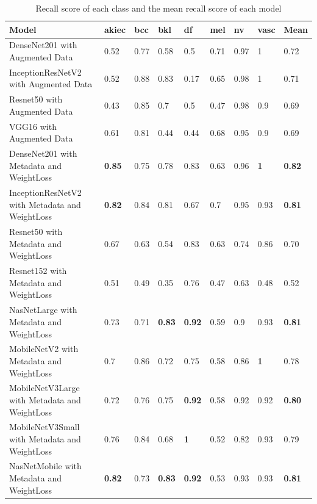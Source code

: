 \documentclass[sensors,article,submit,pdftex,moreauthors]{Definitions/mdpi}
\begin{document}
\begin{table}[h]
	\centering
	\begin{tabular}{|p{5cm} | p{0.6cm} | p{0.6cm} | p{0.6cm} | p{0.6cm} | p{0.6cm} | p{0.6cm} | p{0.6cm} | p{0.7cm}|} 
		\hline
		Model & akiec & bcc & bkl & df & mel & nv & vasc & Mean \\
		\hline
		DenseNet201 with Augmented Data & 0.52 & 0.77 & 0.58 & 0.5 & 0.71 & 0.97 & 1 & 0.72\\ 
		\hline
		InceptionResNetV2 with Augmented Data & 0.52 & 0.88 & 0.83 & 0.17 & 0.65 & 0.98 & 1 & 0.71\\
		\hline
		Resnet50 with Augmented Data & 0.43 & 0.85 & 0.7 & 0.5 & 0.47 & 0.98 & 0.9 & 0.69\\
		\hline 	
		VGG16 with Augmented Data & 0.61 & 0.81 & 0.44 & 0.44 & 0.68 & 0.95 & 0.9 & 0.69\\ 
		\hline		
		DenseNet201 with Metadata and WeightLoss & \textbf{0.85} & 0.75 & 0.78 & 0.83 & 0.63 & 0.96 & \textbf{1} & \textbf{0.82}\\
		\hline
		InceptionResNetV2 with Metadata and WeightLoss & \textbf{0.82} & 0.84 & 0.81 & 0.67 & 0.7 & 0.95 & 0.93 & \textbf{0.81}\\
		\hline
		Resnet50 with Metadata and WeightLoss & 0.67 & 0.63 & 0.54 & 0.83 & 0.63 & 0.74 & 0.86 & 0.70\\
		\hline
		Resnet152 with Metadata and WeightLoss & 0.51 & 0.49 & 0.35 & 0.76 & 0.47 & 0.63 & 0.48 & 0.52\\
		\hline
		NasNetLarge with Metadata and WeightLoss & 0.73 & 0.71 & \textbf{0.83} & \textbf{0.92} & 0.59 & 0.9 & 0.93 & \textbf{0.81}\\
		\hline
		MobileNetV2 with Metadata and WeightLoss & 0.7 & 0.86 & 0.72 & 0.75 & 0.58 & 0.86 & \textbf{1} & 0.78\\
		\hline
		MobileNetV3Large with Metadata and WeightLoss & 0.72 & 0.76 & 0.75 & \textbf{0.92} & 0.58 & 0.92 & 0.92 & \textbf{0.80}\\
		\hline
		MobileNetV3Small with Metadata and WeightLoss & 0.76 & 0.84 & 0.68 & \textbf{1} & 0.52 & 0.82 & 0.93 & 0.79\\
		\hline
		NasNetMobile with Metadata and WeightLoss & \textbf{0.82} & 0.73 & \textbf{0.83} & \textbf{0.92} & 0.53 & 0.93 & 0.93 & \textbf{0.81}\\
		\hline
	\end{tabular}
	\caption{Recall score of each class and the mean recall score of each model}
	\label{table:6}
\end{table}
\end{document}
